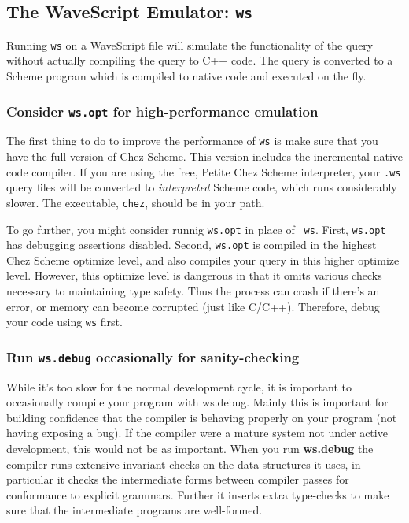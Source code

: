 \subsection{The WaveScript Emulator: {\tt \bf ws} }

Running {\tt ws} on a WaveScript file will simulate the functionality
of the query without actually compiling the query to C++ code.  The
query is converted to a Scheme program which is compiled to native
code and executed on the fly.  

\subsubsection*{Consider {\tt \bf ws.opt} for high-performance emulation}

The first thing to do to improve the performance of {\tt ws} is make
sure that you have the full version of Chez Scheme.  This version
includes the incremental native code compiler.  If you are using the
free, Petite Chez Scheme interpreter, your {\tt .ws} query files will
be converted to {\em interpreted} Scheme code, which runs considerably
slower.  The executable, {\tt chez}, should be in your path.

To go further, you might consider runnig {\tt ws.opt} in place of {\tt
ws}.  First, {\tt ws.opt} has debugging assertions disabled. 
Second, {\tt ws.opt} is compiled in the highest Chez Scheme optimize
level, and also compiles your query in this higher optimize level.
However, this optimize level is dangerous in that it omits various
checks necessary to maintaining type safety.  Thus the process can
crash if there's an error, or memory can become corrupted (just like
C/C++).  Therefore, debug your code using {\tt ws} first.

\subsubsection*{Run {\tt \bf ws.debug} occasionally for sanity-checking}

While it's too slow for the normal development cycle, it is important
to occasionally compile your program with ws.debug.  Mainly this is
important for building confidence that the compiler is behaving
properly on your program (not having exposing a bug).  If the compiler
were a mature system not under active development, this would not be
as important.  When you run {\bf ws.debug} the compiler runs extensive
invariant checks on the data structures it uses, in particular it
checks the intermediate forms between compiler passes for
conformance to explicit grammars.  Further it inserts extra
type-checks to make sure that the intermediate programs are well-formed.

